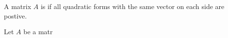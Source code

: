 


A matrix $A$ is 
if all quadratic forms with the
same vector on each side are postive.


Let $A$ be a matr
